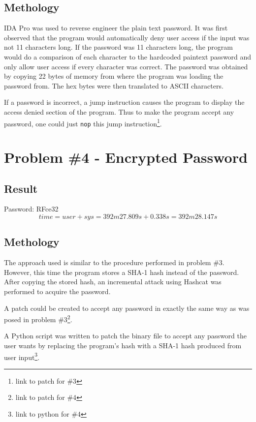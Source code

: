 \documentclass[conference]{IEEEtran}
\begin{document}
\subsection{Methology}
IDA Pro was used to reverse engineer the plain text password. It was first
observed that the program would automatically deny user access if the input was
not 11 characters long. If the password was 11 characters long, the program
would do a comparison of each character to the hardcoded paintext password and
only allow user access if every character was correct. The password was obtained
by copying 22 bytes of memory from where the program was loading the password
from. The hex bytes were then translated to ASCII characters.

If a password is incorrect, a jump instruction causes the program to display the
access denied section of the program. Thus to make the program accept any
password, one could just \texttt{nop} this jump instruction\footnote{link to
patch for \#3}.

\section{Problem \#4 - Encrypted Password}
\subsection{Result}
  \noindent Password: RFce32
  \begin{displaymath}
  time = user + sys = 392m27.809s + 0.338s = 392m28.147s
  \end{displaymath}

\subsection{Methology}
The approach used is similar to the procedure performed in problem \#3. However,
this time the program stores a SHA-1 hash instead of the password. After copying
the stored hash, an incremental attack using Hashcat was performed to acquire
the password.

A patch could be created to accept any password in exactly the same way as was
posed in problem \#3\footnote{link to patch for \#4}.

A Python script was written to patch the binary file to accept any password the
user wants by replacing the program's hash with a SHA-1 hash produced from user
input\footnote{link to python for \#4}.
\end{document}
